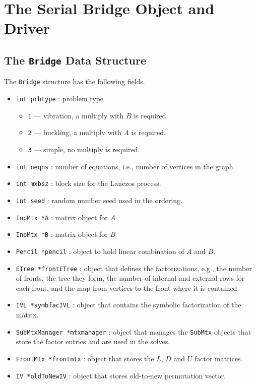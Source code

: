 \chapter{The Serial Bridge Object and Driver}
\label{chapter:serial}
\par
\section{The \texttt{Bridge} Data Structure}
\label{section:Bridge:dataStructure}
\par
The {\tt Bridge} structure has the following fields.
\begin{itemize}
%
\item
{\tt int prbtype} : problem type
\begin{itemize}
\item {\tt 1} --- vibration, a multiply with $B$ is required.
\item {\tt 2} --- buckling, a multiply with $A$ is required.
\item {\tt 3} --- simple, no multiply is required.
\end{itemize}
\item
{\tt int neqns} : number of equations, 
i.e., number of vertices in the graph.
\item
{\tt int mxbsz} : block size for the Lanczos process.
\item
{\tt int seed} : random number seed used in the ordering.
\item
{\tt InpMtx *A} : matrix object for $A$
\item
{\tt InpMtx *B} : matrix object for $B$
\item
{\tt Pencil *pencil} : object to hold linear combination of $A$ and $B$.
\item
{\tt ETree *frontETree} : object that defines the factorizations,
e.g., the number of fronts, the tree they form, the number of
internal and external rows for each front, and the map from
vertices to the front where it is contained.
\item
{\tt IVL *symbfacIVL} : object that contains the symbolic
factorization of the matrix.
\item
{\tt SubMtxManager *mtxmanager} : object that manages the
\texttt{SubMtx} objects that store the factor entries and are used
in the solves.
\item
{\tt FrontMtx *frontmtx} : object that stores the $L$, $D$ and $U$
factor matrices.
\item
{\tt IV *oldToNewIV} : object that stores old-to-new permutation vector.

\end{itemize}
